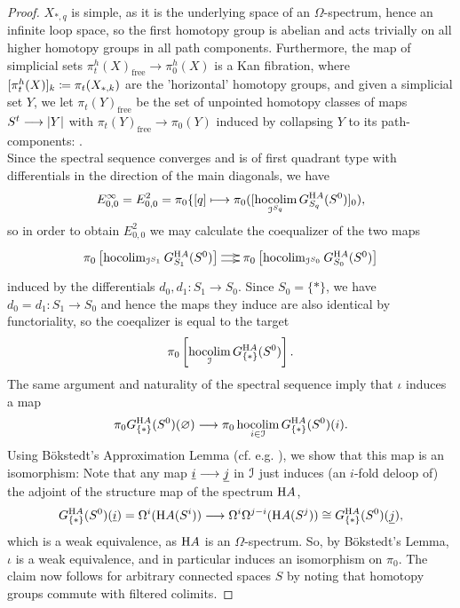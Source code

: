 \begin{lem}
\begin{proof}
      $X_{\ast, q}$ is simple, as it is the underlying space of an
      $\Omega$-spectrum, hence an infinite loop space, so the first homotopy
      group is abelian and acts trivially on all higher homotopy groups in all
      path components. Furthermore, the map of simplicial sets
      $\pi_t^h(X)_{\mathrm{free}} \to \pi_0^h (X)$ is a Kan fibration, where
      $[\pi_t^h(X)]_k \coloneqq \pi_t(X_{\ast,k})$ are the 'horizontal' homotopy
      groups, and given a simplicial set $Y$, we let $\pi_t (Y)_\mathrm{free}$
      be the set of unpointed homotopy classes of maps $S^t \longrightarrow \left\vert Y\right\vert$ with
      $\pi_t(Y)_\mathrm{free} \to \pi_0(Y)$ induced by collapsing $Y$ to its
      path-components: .\\
      Since the spectral sequence converges and is of first quadrant type with
      differentials in the direction of the main diagonals, we have
      \begin{displaymath}
        E^\infty_{0,0} = E^2_{0,0} = \pi_0 \{ [q] \oldmapsto %
          \pi_0( [ \hocolim_{\cI^{S_q}} G^{\H A}_{S_q} (S^0) ]_0 ),	
      \end{displaymath}
      so in order to obtain $E^2_{0,0}$ we may calculate the coequalizer of the
      two maps
      \begin{displaymath}
        \xymatrix@C-=0.5cm{
        \pi_0 \left[ \hocolim_{\cI^{S_1}} G^{\H A}_{S_1} (S^0) \right]
            \ar@<-.5ex>[r] \ar@<.5ex>[r] &%
        \pi_0 \left[ \hocolim_{\cI^{S_0}} G^{\H A}_{S_0} (S^0) \right]
        }
      \end{displaymath}
      induced by the differentials $d_0, d_1: S_1 \to S_0$. Since $S_0 = \{ \ast
      \}$, we have $d_0 = d_1: S_1 \to S_0$ and hence the maps they induce are
      also identical by functoriality, so the coeqalizer is equal to the target
      \[ \pi_0 \left[ \operatorname*{hocolim}_{\mathcal{I}} G^{\mathrm{H} A}_{\{\ast\}} (S^0) \right]. \]
      The same argument and naturality of the spectral sequence imply that
      $\iota$ induces a map
      \begin{displaymath}
        \pi_0 G_{\{\ast\}}^{\H A}(S^0)(\varnothing) \to %
          \pi_0 \hocolim_{i \in \cI} G^{\H A}_{\{\ast\}}(S^0)(i).	
      \end{displaymath}
      Using B\"okstedt's Approximation Lemma (cf. e.g. \cite[Lemma
      2.2.2.2]{dundas2012local}), we show that this map is an isomorphism: Note
      that any map $\underline{i} \longrightarrow \underline{j}$ in $\mathcal{I}$ just induces (an $i$-fold
      deloop of) the adjoint of the structure map of the spectrum $\mathrm{H} A$,
      \begin{displaymath}
        G_{\{\ast\}}^{\H A}(S^0)(\ind{i}) = %
        \Omega^{i}(\H A (S^i)) \to %
        \Omega^{i}\Omega^{j-i}(\H A (S^j)) \cong %
        G_{\{\ast\}}^{\H A}(S^0)(\ind{j}),
      \end{displaymath}
      which is a weak equivalence, as $\mathrm{H} A$ is an $\Omega$-spectrum. So, by
      B\"okstedt's Lemma, $\iota$ is a weak equivalence, and in particular
      induces an isomorphism on $\pi_0$. The claim now follows for arbitrary
      connected spaces $S$ by noting that homotopy groups commute with filtered
      colimits. 
    \end{proof}
  \end{lem}
